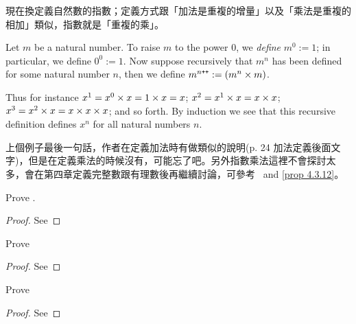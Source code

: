 \begin{note}
現在換定義自然數的指數；定義方式跟「加法是重複的增量」以及「乘法是重複的相加」類似，指數就是「重複的乘」。
\end{note}

\begin{definition} \label{def 2.3.11}
Let \(m\) be a natural number. To raise \(m\) to the power \(0\), we \emph{define} \(m^0 := 1\); in particular, we define \(0^0 := 1\). Now suppose recursively that \(m^n\) has been defined for some natural number \(n\), then we define \(m^{n\texttt{++}} := (m^n \times m)\).
\end{definition}

\begin{example}\label{example 2.3.12}
Thus for instance \(x^1 = x^0 \times x = 1 \times x = x\); \(x^2 = x^1 \times x = x \times x\); \(x^3 = x^2 \times x = x \times x \times x\); and so forth. By induction we see that this recursive definition defines \(x^n\) for all natural numbers \(n\).
\end{example}
\begin{note}
上個例子最後一句話，作者在定義加法時有做類似的說明(p. 24 加法定義後面文字)，但是在定義乘法的時候沒有，可能忘了吧。另外指數乘法這裡不會探討太多，會在第四章定義完整數跟有理數後再繼續討論，可參考\  and \ref{prop 4.3.12}。
\end{note}

\exercisesection

\begin{exercise}\label{exercise 2.3.1}
    Prove .
\end{exercise}
\begin{proof}
    See 
\end{proof}

\begin{exercise}\label{exercise 2.3.2}
    Prove 
\end{exercise}
\begin{proof}
    See 
\end{proof}

\begin{exercise}\label{exercise 2.3.3}
    Prove 
\end{exercise}
\begin{proof}
    See 
\end{proof}

